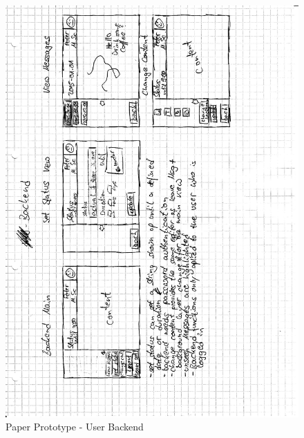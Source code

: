 \newpage
\begin{figure}[h!]
  \centering
    \includegraphics[width=1\textwidth]{./img/paperPrototypeBackend1.png}
  \caption{Paper Prototype - User Backend}
  \label{img:paperPrototypeBackend1}
\end{figure}

